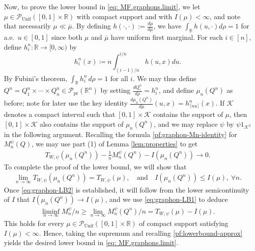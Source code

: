 \documentclass[11pt,reqno]{amsart}
\numberwithin{equation}{section}
\theoremstyle{definition}
\def\R{{\mathbb R}}
\def\P{{\mathcal P}}
\def\Pprod{\P_{\mathrm{pr}}}
\def\Punif{\P_{\mathrm{Unif}}([0,1] \times \R)}
\begin{document}
Now, to prove the lower bound in \eqref{eq: MF.graphons.limit}, we let $\mu \in \Punif$ with compact support and with $I(\mu)<\infty$, and note that necessarily $\mu\ll  \overline{\mu}$. 
By defining $h(\cdot,\cdot):=\frac{d\mu}{d\overline{\mu}}$, we have $\int_{\R} h(u,\cdot)d\rho=1$ for a.e.\ $u \in [0,1]$ since both $\mu$ and $\overline{\mu}$ have uniform first marginal. For each $ i \in [n] $,  define $h^n_i : \R \to  [0,\infty)$ by 
\begin{equation*}
	h^n_i(x) \coloneqq n\int_{(i-1)/n}^{i/n} h(u,x) du.
\end{equation*}
By Fubini's theorem, $\int_{\R}h^n_i \, d\rho=1$ for all $i$.  We may thus define $Q^n = Q^n_1\times\cdots\times Q^n_n\in \Pprod(\R^n)$ by setting
$\frac{dQ^n_i}{d\rho} = h^n_i$, and define $\mu_n(Q^n)$ as before; note for later use the key identity $\frac{d\mu_n(Q^n)}{d\overline{\mu}}(u,x)=h_{\lceil nu\rceil}^n(x)$. If $\mathcal{K}$ denotes a compact interval such that $[0,1] \times \mathcal{K}$ contains the support of $\mu$, then $[0,1] \times \mathcal{K}$ also contains the support of $\mu_n(Q^n)$, and we may replace $\psi$ by $\psi 1_{\mathcal{K}^2}$ in the following argument.
Recalling the formula \eqref{pf:graphon-Mn-identity} for $M_n^\psi(Q)$, we may use  part (1) of Lemma \ref{lem:properties} to get
\begin{align} 
	T_{W,\psi}(\mu_n(Q^n))-\frac{1}{n}M_n^{\psi}(Q^n) -I(
	\mu_n(Q^n)) \to 0. \label{eq:graphon-LB1}
\end{align}
To complete the proof of the lower bound, we will show that
\begin{align}
	\lim_{n\to\infty} T_{W,\psi}(\mu_n(Q^n))= T_{W,\psi}(\mu), \quad \text{and} \quad I(\mu_n(Q^n))\le I(\mu), \ \forall n.	\label{eq:graphon-LB2}
\end{align}
Once \eqref{eq:graphon-LB2} is established, it will follow from the lower semicontinuity of $I$ that $I(\mu_n(Q^n))\to I(\mu)$, and we use \eqref{eq:graphon-LB1} to deduce
\begin{align*}
	\liminf_{n\to\infty}M_n^{\psi} / n \ge \lim_{n\to\infty}M_n^{\psi}(Q^n) / n = T_{W,\psi}(\mu) - I(\mu).
\end{align*}
This holds for every $\mu\in \Punif$ of compact support satisfying $I(\mu) < \infty$. Hence, taking the supremum and recalling \eqref{pf:lowerbound-approx} yields the desired lower bound in \eqref{eq: MF.graphons.limit}. 
\end{document}
